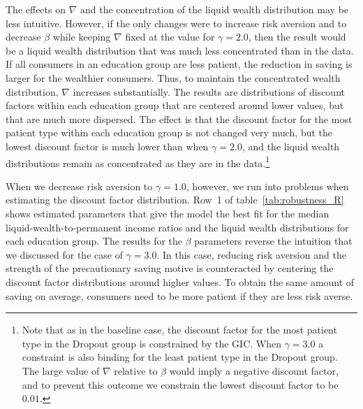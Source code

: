 \documentclass[../HAFiscal]{subfiles}
\begin{document}
The effects on $\nabla$ and the concentration of the liquid wealth distribution may be less intuitive. However, if the only changes were to increase risk aversion and to decrease $\beta$ while keeping $\nabla$ fixed at the value for $\gamma=2.0$, then the result would be a liquid wealth distribution that was much less concentrated than in the data. If all consumers in an education group are less patient, the reduction in saving is larger for the wealthier consumers. Thus, to maintain the concentrated wealth distribution, $\nabla$ increases substantially. The results are distributions of discount factors within each education group that are centered around lower values, but that are much more dispersed. The effect is that the discount factor for the most patient type within each education group is not changed very much, but the lowest discount factor is much lower than when $\gamma=2.0$, and the liquid wealth distributions remain as concentrated as they are in the data.\footnote{Note that as in the baseline case, the discount factor for the most patient type in the Dropout group is constrained by the GIC. When $\gamma=3.0$ a constraint is also binding for the least patient type in the Dropout group. The large value of $\nabla$ relative to $\beta$ would imply a negative discount factor, and to prevent this outcome we constrain the lowest discount factor to be $0.01$.}

When we decrease risk aversion to $\gamma=1.0$, however, we run into problems when estimating the discount factor distribution. Row~1 of table~\ref{tab:robustness_R} shows estimated parameters that give the model the best fit for the median liquid-wealth-to-permanent income ratios and the liquid wealth distributions for each education group. The results for the $\beta$ parameters reverse the intuition that we discussed for the case of $\gamma=3.0$. In this case, reducing risk aversion and the strength of the precautionary saving motive is counteracted by centering the discount factor distributions around higher values. To obtain the same amount of saving on average, consumers need to be more patient if they are less risk averse.  
\end{document}
